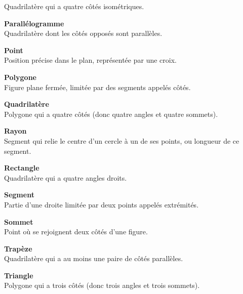 \begin{tcbraster}[raster columns=2, raster equal height, raster valign=top,raster column skip=2mm, raster row skip=2mm]
\begin{terme}
{\small Quadrilatère qui a quatre côtés isométriques.}
\end{terme}
\begin{terme}
\textbf{\large Parallélogramme}\\[2pt]
{\small Quadrilatère dont les côtés opposés sont parallèles.}
\end{terme}
\begin{terme}
\textbf{\large Point}\\[2pt]
{\small Position précise dans le plan, représentée par une croix.}
\end{terme}
\begin{terme}
\textbf{\large Polygone}\\[2pt]
{\small Figure plane fermée, limitée par des segments appelés côtés.}
\end{terme}
\begin{terme}
\textbf{\large Quadrilatère}\\[2pt]
{\small Polygone qui a quatre côtés (donc quatre angles et quatre sommets).}
\end{terme}
\begin{terme}
\textbf{\large Rayon}\\[2pt]
{\small Segment qui relie le centre d'un cercle à un de ses points, ou longueur de ce segment.}
\end{terme}
\begin{terme}
\textbf{\large Rectangle}\\[2pt]
{\small Quadrilatère qui a quatre angles droits.}
\end{terme}
\begin{terme}
\textbf{\large Segment}\\[2pt]
{\small Partie d'une droite limitée par deux points appelés extrémités.}
\end{terme}
\begin{terme}
\textbf{\large Sommet}\\[2pt]
{\small Point où se rejoignent deux côtés d'une figure.}
\end{terme}
\begin{terme}
\textbf{\large Trapèze}\\[2pt]
{\small Quadrilatère qui a au moins une paire de côtés parallèles.}
\end{terme}
\begin{terme}
\textbf{\large Triangle}\\[2pt]
{\small Polygone qui a trois côtés (donc trois angles et trois sommets).}
\end{terme}
\begin{terme}

\end{terme}
\end{tcbraster}
